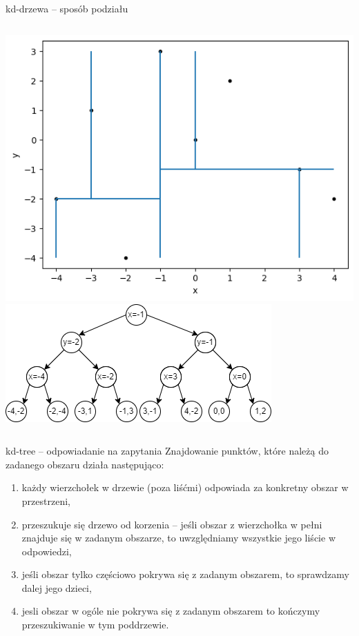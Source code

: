 \documentclass[aspectratio=169,dvipsnames]{beamer}
\begin{document}
\begin{frame}{kd-drzewa -- sposób podziału}
    \begin{columns}
        \includegraphics[width=\textwidth]{images/plots/8}
        \includegraphics[width=\textwidth]{images/trees/12.drawio}
    \end{columns}
\end{frame}

\begin{frame}{kd-tree -- odpowiadanie na zapytania}
    Znajdowanie punktów, które należą do zadanego obszaru działa następująco:
    \begin{enumerate}
        \item<2-> każdy wierzchołek w drzewie (poza liśćmi) odpowiada za konkretny obszar w przestrzeni,
        \item<3-> przeszukuje się drzewo od korzenia -- jeśli obszar z wierzchołka w pełni znajduje się w zadanym obszarze, to uwzględniamy wszystkie jego liście w odpowiedzi,
        \item<4-> jeśli obszar tylko częściowo pokrywa się z zadanym obszarem, to sprawdzamy dalej jego dzieci,
        \item<5-> jesli obszar w ogóle nie pokrywa się z zadanym obszarem to kończymy przeszukiwanie w tym poddrzewie.
    \end{enumerate}
\end{frame}
\end{document}
